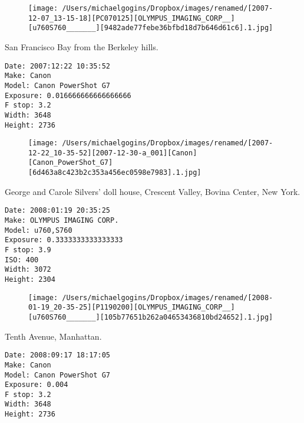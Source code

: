 \documentclass[11pt,letter,DIV=14,paper=landscape]{scrbook}
\begin{document}
\begin{figure}
\texttt{[image: /Users/michaelgogins/Dropbox/images/renamed/[2007-12-07\_13-15-18][PC070125][OLYMPUS\_IMAGING\_CORP\_\_][u760S760\_\_\_\_\_\_\_][9482ade77febe36bfbd18d7b646d61c6].1.jpg]}
\end{figure}
    
\clearpage
\noindent San Francisco Bay from the Berkeley hills.
\noindent
\begin{lstlisting}
Date: 2007:12:22 10:35:52
Make: Canon
Model: Canon PowerShot G7
Exposure: 0.016666666666666666
F stop: 3.2
Width: 3648
Height: 2736
\end{lstlisting}
\clearpage

\begin{figure}
\texttt{[image: /Users/michaelgogins/Dropbox/images/renamed/[2007-12-22\_10-35-52][2007-12-30-a\_001][Canon][Canon\_PowerShot\_G7][6d463a8c423b2c353a456ec0598e7983].1.jpg]}
\end{figure}
    
\clearpage
\noindent George and Carole Silvers' doll house, Crescent Valley, Bovina Center, New York.
\noindent
\begin{lstlisting}
Date: 2008:01:19 20:35:25
Make: OLYMPUS IMAGING CORP.  
Model: u760,S760       
Exposure: 0.3333333333333333
F stop: 3.9
ISO: 400
Width: 3072
Height: 2304
\end{lstlisting}
\clearpage

\begin{figure}
\texttt{[image: /Users/michaelgogins/Dropbox/images/renamed/[2008-01-19\_20-35-25][P1190200][OLYMPUS\_IMAGING\_CORP\_\_][u760S760\_\_\_\_\_\_\_][105b77651b262a04653436810bd24652].1.jpg]}
\end{figure}
    
\clearpage
\noindent Tenth Avenue, Manhattan.
\noindent
\begin{lstlisting}
Date: 2008:09:17 18:17:05
Make: Canon
Model: Canon PowerShot G7
Exposure: 0.004
F stop: 3.2
Width: 3648
Height: 2736
\end{lstlisting}
\clearpage
\end{document}
